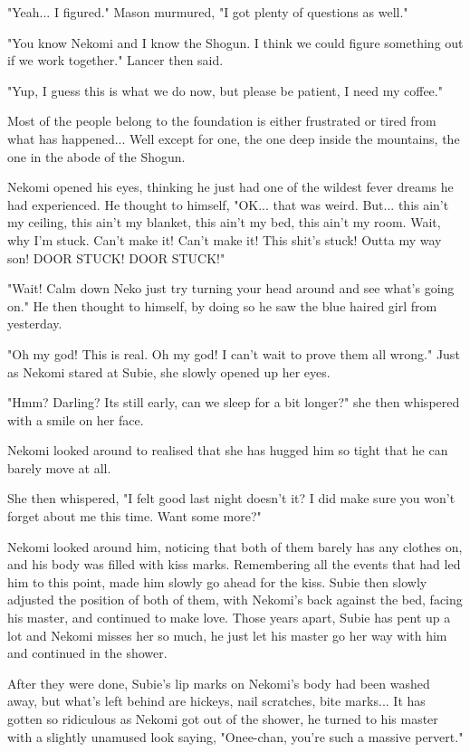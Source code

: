 "Yeah... I figured." Mason murmured, "I got plenty of questions as well."

"You know Nekomi and I know the Shogun. I think we could figure something out if we work together." Lancer then said. 

"Yup, I guess this is what we do now, but please be patient, I need my coffee."

Most of the people belong to the foundation is either frustrated or tired from what has happened... 
Well except for one, the one deep inside the mountains, the one in the abode of the Shogun. 

\hfill

Nekomi opened his eyes, thinking he just had one of the wildest fever dreams he had experienced. 
He thought to himself, "OK... that was weird. But... this ain't my ceiling, this ain't my blanket, this ain't my bed, this ain't my room. Wait, why I'm stuck. Can't make it! Can't make it! This shit's stuck! Outta my way son! DOOR STUCK! DOOR STUCK!"

"Wait! Calm down Neko just try turning your head around and see what's going on." He then thought to himself, by doing so he saw the blue haired girl from yesterday. 

"Oh my god! This is real. Oh my god! I can't wait to prove them all wrong." Just as Nekomi stared at Subie, she slowly opened up her eyes. 

"Hmm? Darling? Its still early, can we sleep for a bit longer?" she then whispered with a smile on her face. 

Nekomi looked around to realised that she has hugged him so tight that he can barely move at all. 

She then whispered, "I felt good last night doesn't it? I did make sure you won't forget about me this time. Want some more?"

Nekomi looked around him, noticing that both of them barely has any clothes on, and his body was filled with kiss marks. 
Remembering all the events that had led him to this point, made him slowly go ahead for the kiss. 
Subie then slowly adjusted the position of both of them, with Nekomi's back against the bed, facing his master, and continued to make love. 
Those years apart, Subie has pent up a lot and Nekomi misses her so much, he just let his master go her way with him and continued in the shower.

After they were done, Subie's lip marks on Nekomi's body had been washed away, but what's left behind are hickeys, nail scratches, bite marks... It has gotten so ridiculous as Nekomi got out of the shower, he turned to his master with a slightly unamused look saying, "Onee-chan, you're such a massive pervert."

